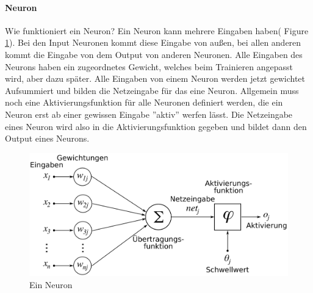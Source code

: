 \documentclass{hbrs-ecta-report}
\begin{document}
 \paragraph{Neuron}
 Wie funktioniert ein Neuron? Ein Neuron kann mehrere Eingaben haben( Figure \ref{fig:Neuron}). Bei den Input Neuronen kommt diese Eingabe von außen, bei allen anderen kommt die Eingabe von dem Output von anderen Neuronen. Alle Eingaben des Neurons haben ein zugeordnetes Gewicht, welches beim Trainieren angepasst wird, aber dazu später. Alle Eingaben von einem Neuron werden jetzt gewichtet Aufsummiert und bilden die Netzeingabe für das eine Neuron. Allgemein muss noch eine Aktivierungsfunktion für alle Neuronen definiert werden, die ein Neuron erst ab einer gewissen Eingabe ''aktiv'' werfen lässt. Die Netzeingabe eines Neuron wird also in die Aktivierungsfunktion gegeben und bildet dann den Output eines Neurons.
 
\begin{figure}[h!]
	\includegraphics[width=\linewidth]{img/Neuron}
	\caption{Ein Neuron}
	\label{fig:Neuron}
\end{figure}
\end{document}
